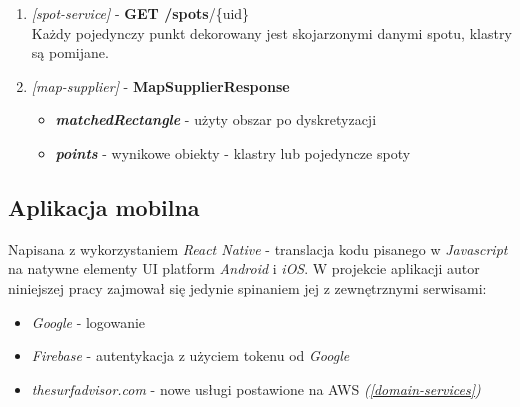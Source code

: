 \begin{enumerate}
    \bigskip\bigskip\bigskip

    \item
    \large{\emph{[spot-service]} - \textbf{GET /spots}/\{uid\}}\normalsize\\
    Każdy pojedynczy punkt dekorowany jest skojarzonymi danymi spotu, klastry są pomijane.

    \bigskip\bigskip\bigskip

    \item
    \large\emph{[map-supplier]} - \textbf{MapSupplierResponse}\normalsize
    \begin{itemize}
        \item
        \textbf{\emph{matchedRectangle}} - użyty obszar po dyskretyzacji

        \item
        \textbf{\emph{points}} - wynikowe obiekty - klastry lub pojedyncze spoty

    \end{itemize} 
    
\end{enumerate}

\newpage

\subsection{Aplikacja mobilna}

Napisana z wykorzystaniem \emph{React Native} - translacja kodu pisanego w \emph{Javascript} na natywne elementy UI platform \emph{Android} i \emph{iOS}.
W projekcie aplikacji autor niniejszej pracy zajmował się jedynie spinaniem jej z zewnętrznymi serwisami:

\begin{itemize}
    \item
    \emph{Google} - logowanie

    \item
    \emph{Firebase} - autentykacja z użyciem tokenu od \emph{Google}

    \item
    \emph{thesurfadvisor.com} - nowe usługi postawione na AWS \emph{(\ref{domain-services})}

\end{itemize} 

